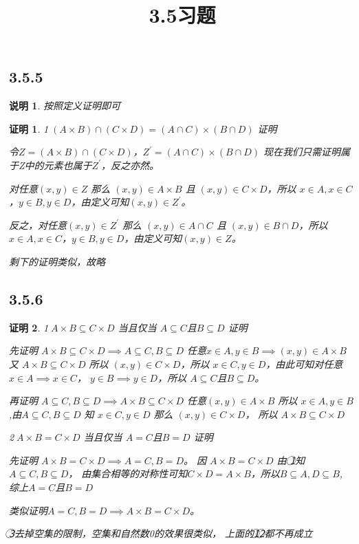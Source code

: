 \documentclass{article}
\theoremstyle{mystyle}
\newtheorem*{zremark}{说明}
\theoremstyle{zproofstyle}
\newtheorem*{zproof}{证明}
\begin{document}
\title{3.5习题}
\maketitle
\subsection*{3.5.5}

\begin{zgraytheorem}
  \begin{zremark}
    按照定义证明即可
  \end{zremark}
\end{zgraytheorem}
\begin{zproof}
  \textcircled{1}$(A \times B) \cap (C \times D) = (A \cap C) \times (B \cap D)$ 证明

  令$Z = (A \times B) \cap (C \times D)$，$Z^\prime=(A \cap C) \times (B \cap D)$
  现在我们只需证明属于Z中的元素也属于$Z^\prime$，反之亦然。

  对任意$(x,y) \in Z$ 那么 $(x,y)\in A \times B$ 且 $(x,y)\in C \times D$，所以
  $x \in A , x \in C$，$y \in B , y \in D$，由定义可知$(x,y) \in Z^\prime$。

  反之，对任意$(x,y) \in Z^\prime$ 那么 $(x,y)\in A \cap C$ 且 $(x,y)\in B \cap D$，所以
  $x \in A , x \in C$，$y \in B , y \in D$，由定义可知$(x,y) \in Z$。

  剩下的证明类似，故略
\end{zproof}

\subsection*{3.5.6}
\begin{zproof}
  \textcircled{1}$A \times B \subseteq C \times D$ 当且仅当 $A \subseteq C$且$B \subseteq D$ 证明

  先证明 $A \times B \subseteq C \times D \implies A \subseteq C,B \subseteq D$
  任意$x \in A, y \in B \implies (x,y) \in A \times B$ 又 $A \times B \subseteq C \times D$
  所以 $(x,y) \in C \times D$，所以 $x \in C , y \in D$，由此可知对任意$x \in A \implies x \in C$，
  $y \in B \implies y \in D$，所以 $A \subseteq C$且$B \subseteq D$。

  再证明 $A \subseteq C,B \subseteq D \implies A \times B \subseteq C \times D$ 任意$(x,y) \in A \times B$
  所以 $x \in A , y \in B$,由$A \subseteq C,B \subseteq D$ 知 $x \in C , y \in D$ 那么 $(x,y) \in C \times D$，
  所以 $A \times B \subseteq C \times D$

  \textcircled{2}$A \times B = C \times D$ 当且仅当 $A = C$且$B = D$ 证明

  先证明 $A \times B = C \times D \implies A = C,B = D$。
  因 $A \times B = C \times D$ 由 \textcircled{1}知$A \subseteq C,B \subseteq D$，
  由集合相等的对称性可知$C \times D = A \times B$，所以$B \subseteq A,D \subseteq B$,
  综上$A = C$且$B = D$

  类似证明$A = C,B = D \implies A \times B = C \times D$。

  \textcircled{3}去掉空集的限制，空集和自然数0的效果很类似，
  上面的\textcircled{1}\textcircled{2}都不再成立
\end{zproof}
\end{document}
